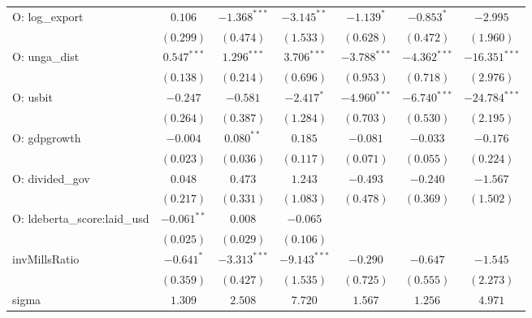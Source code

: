 \begin{table}
\begin{center}
\begin{tabular}{l c c c c c c}
O: log\_export                & $0.106$        & $-1.368^{***}$ & $-3.145^{**}$  & $-1.139^{*}$   & $-0.853^{*}$   & $-2.995$        \\
                              & $(0.299)$      & $(0.474)$      & $(1.533)$      & $(0.628)$      & $(0.472)$      & $(1.960)$       \\
O: unga\_dist                 & $0.547^{***}$  & $1.296^{***}$  & $3.706^{***}$  & $-3.788^{***}$ & $-4.362^{***}$ & $-16.351^{***}$ \\
                              & $(0.138)$      & $(0.214)$      & $(0.696)$      & $(0.953)$      & $(0.718)$      & $(2.976)$       \\
O: usbit                      & $-0.247$       & $-0.581$       & $-2.417^{*}$   & $-4.960^{***}$ & $-6.740^{***}$ & $-24.784^{***}$ \\
                              & $(0.264)$      & $(0.387)$      & $(1.284)$      & $(0.703)$      & $(0.530)$      & $(2.195)$       \\
O: gdpgrowth                  & $-0.004$       & $0.080^{**}$   & $0.185$        & $-0.081$       & $-0.033$       & $-0.176$        \\
                              & $(0.023)$      & $(0.036)$      & $(0.117)$      & $(0.071)$      & $(0.055)$      & $(0.224)$       \\
O: divided\_gov               & $0.048$        & $0.473$        & $1.243$        & $-0.493$       & $-0.240$       & $-1.567$        \\
                              & $(0.217)$      & $(0.331)$      & $(1.083)$      & $(0.478)$      & $(0.369)$      & $(1.502)$       \\
O: ldeberta\_score:laid\_usd  & $-0.061^{**}$  & $0.008$        & $-0.065$       &                &                &                 \\
                              & $(0.025)$      & $(0.029)$      & $(0.106)$      &                &                &                 \\
invMillsRatio                 & $-0.641^{*}$   & $-3.313^{***}$ & $-9.143^{***}$ & $-0.290$       & $-0.647$       & $-1.545$        \\
                              & $(0.359)$      & $(0.427)$      & $(1.535)$      & $(0.725)$      & $(0.555)$      & $(2.273)$       \\
sigma                         & $1.309$        & $2.508$        & $7.720$        & $1.567$        & $1.256$        & $4.971$         \\

\end{tabular}
\end{center}
\end{table}
